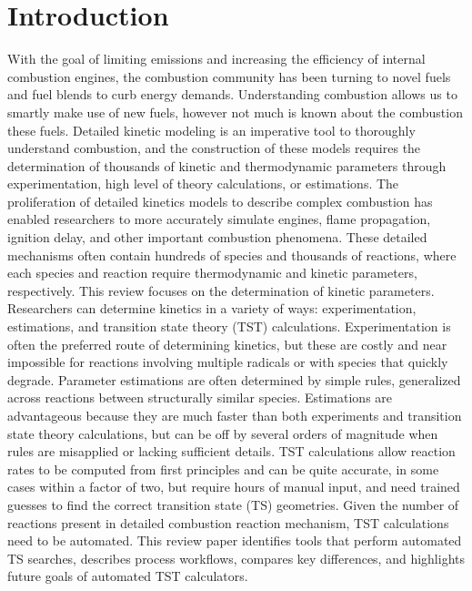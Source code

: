 \documentclass[preprint, 11pt]{elsarticle} %
\begin{document}
\section{Introduction}
% 
With the goal of limiting emissions and increasing the efficiency of internal combustion engines, the combustion community has been turning to novel fuels and fuel blends to curb energy demands.
Understanding combustion allows us to smartly make use of new fuels, however not much is known about the combustion these fuels.
Detailed kinetic modeling is an imperative tool to thoroughly understand combustion, and the construction of these models requires the determination of thousands of kinetic and thermodynamic parameters through experimentation, high level of theory calculations, or estimations. 
The proliferation of detailed kinetics models to describe complex combustion has enabled researchers to more accurately simulate engines, flame propagation, ignition delay, and other important combustion phenomena. 
These detailed mechanisms often contain hundreds of species and thousands of reactions, where each species and reaction require thermodynamic and kinetic parameters, respectively. 
This review focuses on the determination of kinetic parameters.
Researchers can determine kinetics in a variety of ways: experimentation, estimations, and transition state theory (TST) calculations.
Experimentation is often the preferred route of determining kinetics, but these are costly and near impossible for reactions involving multiple radicals or with species that quickly degrade.
Parameter estimations are often determined by simple rules, generalized across reactions between structurally similar species. 
Estimations are advantageous because they are much faster than both experiments and transition state theory calculations, but can be off by several orders of magnitude when rules are misapplied or lacking sufficient details. 
TST calculations allow reaction rates to be computed from first principles and can be quite accurate, in some cases within a factor of two, but require hours of manual input, and need trained guesses to find the correct transition state (TS) geometries. 
Given the number of reactions present in detailed combustion reaction mechanism, TST calculations need to be automated.
This review paper identifies tools that perform automated TS searches, describes process workflows, compares key differences, and highlights future goals of automated TST calculators.

\end{document}
